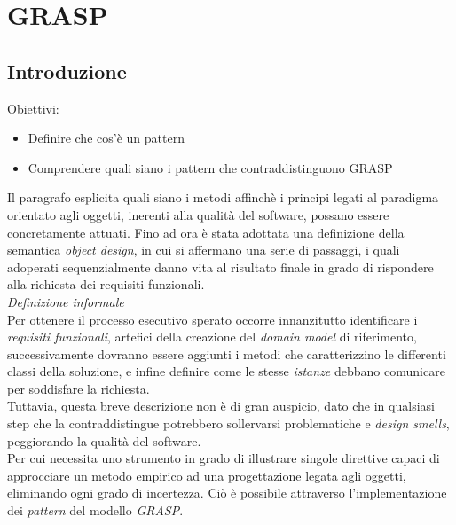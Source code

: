 \documentclass{article}
\begin{document}
\pagestyle{empty}
\section*{GRASP}
\large

\subsection*{Introduzione}
\large
Obiettivi:
\begin{itemize}
    \renewcommand{\labelitemi}{-}
    \itemsep0em
    \item Definire che cos'è un pattern
    \item Comprendere quali siano i pattern che contraddistinguono GRASP
\end{itemize}
Il paragrafo esplicita quali siano i metodi affinchè i principi legati al paradigma orientato agli oggetti, inerenti alla qualità del software, possano essere concretamente attuati. Fino ad ora è stata adottata una definizione della semantica \textit{object design}, in cui si affermano una serie di passaggi, i quali adoperati sequenzialmente danno vita al risultato finale in grado di rispondere alla richiesta dei requisiti funzionali.\vspace*{14pt}\\
\textit{Definizione informale}\\
Per ottenere il processo esecutivo sperato occorre innanzitutto identificare i \textit{requisiti funzionali}, artefici della creazione del \textit{domain model} di riferimento, successivamente dovranno essere aggiunti i metodi che caratterizzino le differenti classi della soluzione, e infine definire come le stesse \textit{istanze} debbano comunicare per soddisfare la richiesta.\vspace*{14pt}\\
Tuttavia, questa breve descrizione non è di gran auspicio, dato che in qualsiasi step che la contraddistingue potrebbero sollervarsi problematiche e \textit{design smells}, peggiorando la qualità del software.\vspace*{14pt}\\
Per cui necessita uno strumento in grado di illustrare singole direttive capaci di approcciare un metodo empirico ad una progettazione legata agli oggetti, eliminando ogni grado di incertezza. Ciò è possibile attraverso l'implementazione dei \textit{pattern} del modello \textit{GRASP}.
\end{document}
